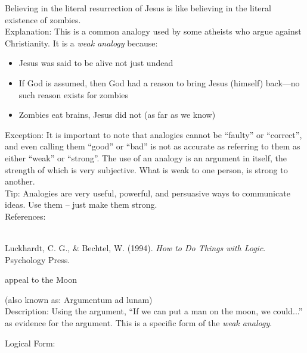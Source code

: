 \documentclass[a4paper,12pt,single,pdftex]{scrbook}
\begin{document}
{    
      Believing in the literal resurrection of Jesus is like believing in the literal existence of zombies.
    \\

    
      Explanation: This is a common analogy used by some atheists who argue against Christianity.  It is a {\it weak analogy} because:
    \\

    \begin{itemize}
  \item 
        Jesus was said to be alive not just undead
      \item 
        If God is assumed, then God had a reason to bring Jesus (himself) back—no such reason exists for zombies
      \item 
        Zombies eat brains, Jesus did not (as far as we know)
      
    \end{itemize}
  
    
      Exception: It is important to note that analogies cannot be “faulty” or “correct”, and even calling them “good” or “bad” is not as accurate as referring to them as either “weak” or “strong”.  The use of an analogy is an argument in itself, the strength of which is very subjective.  What is weak to one person, is strong to another.
    \\

    
      Tip: Analogies are very useful, powerful, and persuasive ways to communicate ideas.  Use them -- just make them strong.
    \\

    References:

    
      
        
      \\

      
        
          Luckhardt, C. G., \& Bechtel, W. (1994). {\it How to Do Things with Logic}. Psychology Press.
        
      
    
  }


appeal to the Moon
    
      (also known as: Argumentum ad lunam)
    \\

  
    Description: Using the argument, “If we can put a man on the moon, we could...” as evidence for the argument. This is a specific form of the {\it weak analogy}.

    
      Logical Form:
    \\
\end{document}

